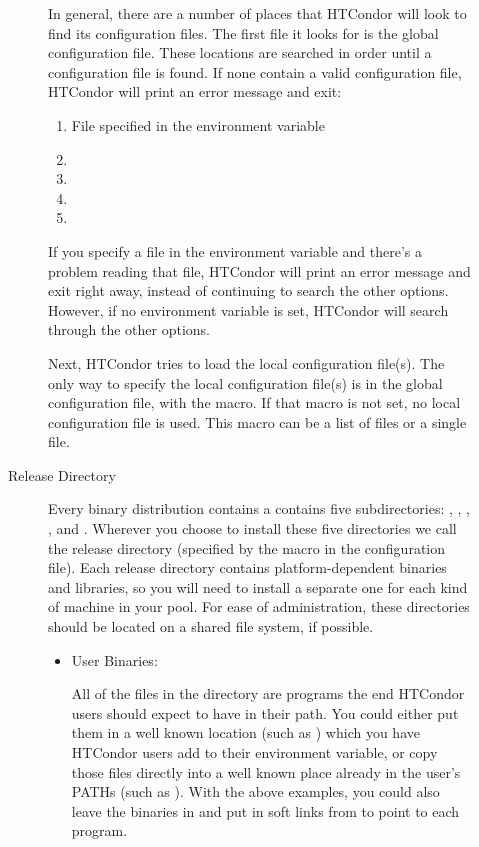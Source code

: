 \begin{description}
\begin{description}
In general, there are a number of places that HTCondor will look to find
its configuration files.  The first file it looks for is the global configuration
file.  These locations are searched in order until a configuration file is
found.  If none contain a valid configuration file, HTCondor will print an
error message and exit:
\begin{enumerate}
   \item File specified in the  environment variable
   \item {}
   \item {}
   \item {}
   \item {}
\end{enumerate}

If you specify a file in the  environment variable
and there's a problem reading that file, HTCondor will print an error
message and exit right away, instead of continuing to search the other
options.
However, if no  environment variable is set,
HTCondor will search through the other options.

Next, HTCondor tries to load the local configuration file(s).
The only way to specify the local configuration file(s) is in the global configuration
file, with the  macro.  If that macro is not
set, no local configuration file is used.  This macro can be a list of files
or a single file.

\item[Release Directory]

Every binary distribution contains a contains
five subdirectories: , , , ,
and . Wherever you
choose to install these five directories we call the release directory
(specified by the  macro in the configuration file).
Each
release directory contains platform-dependent binaries and libraries,
so you will need to install a separate one for each kind of machine in
your pool.  For ease of administration, these directories should be
located on a shared file system, if possible.

\begin{itemize}
     \item User Binaries:

     All of the files in the  directory are programs the end
     HTCondor users should expect to have in their path.  You could
     either put them in a well known location (such as
     ) which you have HTCondor users add to
     their  environment variable, or copy those files
     directly into a well known place already in the user's PATHs (such as
     ).  With the above examples, you could also
     leave the binaries in  and put in
     soft links from  to point to each program.


\end{itemize}
\end{description}
\end{description}
